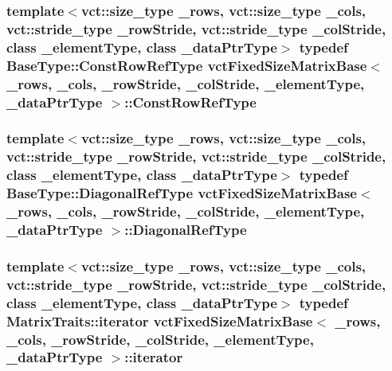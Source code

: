 \hypertarget{classvct_fixed_size_matrix_base_a506ec116d1e4c9c1b5d89f9f952e5b2d}{
\subsubsection[{Const\-Row\-Ref\-Type}]{\setlength{\rightskip}{0pt plus 5cm}template$<$vct\-::size\-\_\-type \-\_\-rows, vct\-::size\-\_\-type \-\_\-cols, vct\-::stride\-\_\-type \-\_\-row\-Stride, vct\-::stride\-\_\-type \-\_\-col\-Stride, class \-\_\-element\-Type, class \-\_\-data\-Ptr\-Type$>$ typedef {\bf Base\-Type\-::\-Const\-Row\-Ref\-Type} {\bf vct\-Fixed\-Size\-Matrix\-Base}$<$ \-\_\-rows, \-\_\-cols, \-\_\-row\-Stride, \-\_\-col\-Stride, \-\_\-element\-Type, \-\_\-data\-Ptr\-Type $>$\-::{\bf Const\-Row\-Ref\-Type}}}\label{classvct_fixed_size_matrix_base_a506ec116d1e4c9c1b5d89f9f952e5b2d}
\hypertarget{classvct_fixed_size_matrix_base_af379c84a0eb55ebfac0c6bf715eb28e3}{
\subsubsection[{Diagonal\-Ref\-Type}]{\setlength{\rightskip}{0pt plus 5cm}template$<$vct\-::size\-\_\-type \-\_\-rows, vct\-::size\-\_\-type \-\_\-cols, vct\-::stride\-\_\-type \-\_\-row\-Stride, vct\-::stride\-\_\-type \-\_\-col\-Stride, class \-\_\-element\-Type, class \-\_\-data\-Ptr\-Type$>$ typedef {\bf Base\-Type\-::\-Diagonal\-Ref\-Type} {\bf vct\-Fixed\-Size\-Matrix\-Base}$<$ \-\_\-rows, \-\_\-cols, \-\_\-row\-Stride, \-\_\-col\-Stride, \-\_\-element\-Type, \-\_\-data\-Ptr\-Type $>$\-::{\bf Diagonal\-Ref\-Type}}}\label{classvct_fixed_size_matrix_base_af379c84a0eb55ebfac0c6bf715eb28e3}
\hypertarget{classvct_fixed_size_matrix_base_aeeeca0bc3fc21d2e48fd8e1ae2eaf836}{
\subsubsection[{iterator}]{\setlength{\rightskip}{0pt plus 5cm}template$<$vct\-::size\-\_\-type \-\_\-rows, vct\-::size\-\_\-type \-\_\-cols, vct\-::stride\-\_\-type \-\_\-row\-Stride, vct\-::stride\-\_\-type \-\_\-col\-Stride, class \-\_\-element\-Type, class \-\_\-data\-Ptr\-Type$>$ typedef {\bf Matrix\-Traits\-::iterator} {\bf vct\-Fixed\-Size\-Matrix\-Base}$<$ \-\_\-rows, \-\_\-cols, \-\_\-row\-Stride, \-\_\-col\-Stride, \-\_\-element\-Type, \-\_\-data\-Ptr\-Type $>$\-::{\bf iterator}}}\label{classvct_fixed_size_matrix_base_aeeeca0bc3fc21d2e48fd8e1ae2eaf836}
